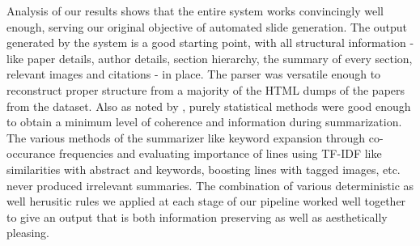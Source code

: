 Analysis of our results shows that the entire system works convincingly well enough,
serving our original objective of automated slide generation.
The output generated by the system is a good starting point, with all structural
information - like paper details, author details, section hierarchy, the summary of every
section, relevant images and citations - in place.
The parser was versatile enough to reconstruct proper structure from a majority of the HTML
dumps of the papers from the dataset.
Also as noted by \cite{sravanthi}, purely statistical methods were good enough to obtain a
minimum level of coherence and information during summarization.
The various methods of the summarizer like keyword expansion through co-occurance frequencies and
evaluating importance of lines using TF-IDF like similarities with abstract and keywords, boosting
lines with tagged images, etc. never produced irrelevant summaries.
The combination of various deterministic as well herusitic rules we applied at each
stage of our pipeline worked well together to give an output that is both information preserving
as well as aesthetically pleasing.
